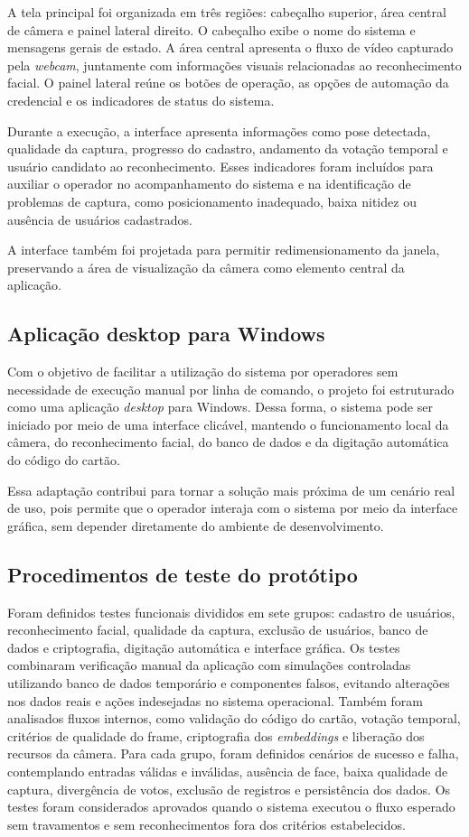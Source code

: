 A tela principal foi organizada em três regiões: cabeçalho superior, área central de câmera e painel lateral direito. O cabeçalho exibe o nome do sistema e mensagens gerais de estado. A área central apresenta o fluxo de vídeo capturado pela \textit{webcam}, juntamente com informações visuais relacionadas ao reconhecimento facial. O painel lateral reúne os botões de operação, as opções de automação da credencial e os indicadores de status do sistema.

Durante a execução, a interface apresenta informações como pose detectada, qualidade da captura, progresso do cadastro, andamento da votação temporal e usuário candidato ao reconhecimento. Esses indicadores foram incluídos para auxiliar o operador no acompanhamento do sistema e na identificação de problemas de captura, como posicionamento inadequado, baixa nitidez ou ausência de usuários cadastrados.

A interface também foi projetada para permitir redimensionamento da janela, preservando a área de visualização da câmera como elemento central da aplicação.

\subsection{Aplicação desktop para Windows}

Com o objetivo de facilitar a utilização do sistema por operadores sem necessidade de execução manual por linha de comando, o projeto foi estruturado como uma aplicação \textit{desktop} para Windows. Dessa forma, o sistema pode ser iniciado por meio de uma interface clicável, mantendo o funcionamento local da câmera, do reconhecimento facial, do banco de dados e da digitação automática do código do cartão.

Essa adaptação contribui para tornar a solução mais próxima de um cenário real de uso, pois permite que o operador interaja com o sistema por meio da interface gráfica, sem depender diretamente do ambiente de desenvolvimento.

\subsection{Procedimentos de teste do protótipo}

    Foram definidos testes funcionais divididos em sete grupos: cadastro de usuários, reconhecimento facial, qualidade da captura, exclusão de usuários, banco de dados e criptografia, digitação automática e interface gráfica. Os testes combinaram verificação manual da aplicação com simulações controladas utilizando banco de dados temporário e componentes falsos, evitando alterações nos dados reais e ações indesejadas no sistema operacional. Também foram analisados fluxos internos, como validação do código do cartão, votação temporal, critérios de qualidade do frame, criptografia dos \textit{embeddings} e liberação dos recursos da câmera. Para cada grupo, foram definidos cenários de sucesso e falha, contemplando entradas válidas e inválidas, ausência de face, baixa qualidade de captura, divergência de votos, exclusão de registros e persistência dos dados. Os testes foram considerados aprovados quando o sistema executou o fluxo esperado sem travamentos e sem reconhecimentos fora dos critérios estabelecidos.